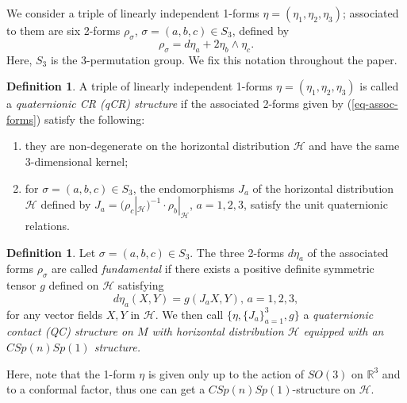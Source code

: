 \documentclass [12pt,a4paper]{amsart}
\newcommand{\calH}{\mathcal{H}}
\newcommand{\R}{\mathbb{R}}
\theoremstyle{plain}
\theoremstyle{definition}
\newtheorem{defi}[thm]{Definition}
\numberwithin{equation}{section}
\begin{document}
We consider a triple of linearly independent 1-forms $\eta=(\eta_1, \eta_2, \eta_3)$; associated to them are six 2-forms $\rho_\sigma$, $\sigma=(a,b,c)\in S_3$, defined by
\begin{equation}\label{eq-assoc-forms}
\rho_\sigma=d\eta_a+2\eta_b\wedge\eta_c.
\end{equation}
Here, $S_3$ is the 3-permutation group. We fix this notation throughout the paper. 
\begin{defi}\label{defi:qCR}
A triple of linearly independent 1-forms $\eta=(\eta_1, \eta_2, \eta_3)$ is called a {\it quaternionic CR (qCR) structure} if the associated 2-forms  given by (\ref{eq-assoc-forms}) satisfy the following:
\begin{enumerate}
\item[{(1)}] they are non-degenerate on the horizontal distribution $\calH$ and have the same 3-dimensional kernel;
\item [{(2)}] for $\sigma=(a,b,c)\in S_3$, the endomorphisms $J_a$ of the horizontal distribution $\calH$ defined by
$J_a=(\rho_c|_\calH)^{-1}\cdot\rho_b|_\calH$, $a=1,2,3$,
satisfy the unit quaternionic relations.
\end{enumerate}
\end{defi}
\begin{defi}\label{defi:QC}
Let $\sigma=(a,b,c)\in S_3$. The three 2-forms $d\eta_a$ of the associated forms $\rho_\sigma$ are called {\it fundamental} if there exists a positive definite symmetric tensor  $g$ defined on  $\calH$ satisfying
$$d\eta_a(X, Y)=g(J_a X, Y),\, a=1, 2, 3,$$
for any vector fields $X, Y$ in $\calH$. We then call $\{\eta, \{J_a\}_{a=1}^3, g\}$  a {\it quaternionic contact (QC) structure on $M$ with horizontal distribution $\calH$ equipped with an $CSp(n)Sp(1)$ structure.} 
\end{defi}
Here, note that the 1-form $\eta$ is given only up to the action of $SO(3)$ on $\R^3$ and to a conformal factor, thus one can get a $CSp(n)Sp(1)$-structure on $\calH.$
\end{document}
